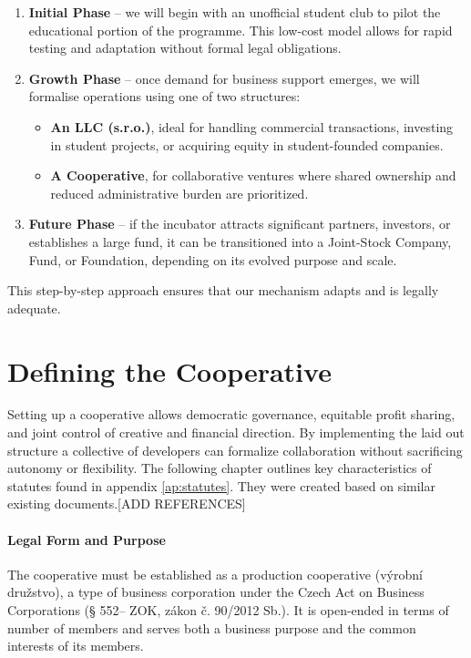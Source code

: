 \begin{enumerate}
    \item \textbf{Initial Phase} – we will begin with an unofficial student club to pilot the educational portion of the programme. This low-cost model allows for rapid testing and adaptation without formal legal obligations.
    \item \textbf{Growth Phase} – once demand for business support emerges, we will formalise operations using one of two structures:
    \begin{itemize}
        \item \textbf{An LLC (s.r.o.)}, ideal for handling commercial transactions, investing in student projects, or acquiring equity in student-founded companies.
        \item \textbf{A Cooperative}, for collaborative ventures where shared ownership and reduced administrative burden are prioritized.
    \end{itemize}
    \item \textbf{Future Phase} – if the incubator attracts significant partners, investors, or establishes a large fund, it can be transitioned into a Joint-Stock Company, Fund, or Foundation, depending on its evolved purpose and scale.
\end{enumerate}

This step-by-step approach ensures that our mechanism adapts and is legally adequate.


\section{Defining the Cooperative}
Setting up a cooperative allows democratic governance, equitable profit sharing, and joint control of creative and financial direction. By implementing the laid out structure a collective of developers can formalize collaboration without sacrificing autonomy or flexibility. The following chapter outlines key characteristics of statutes found in appendix \ref{ap:statutes}. They were created based on similar existing documents.[ADD REFERENCES]
\paragraph{Legal Form and Purpose}
The cooperative must be established as a production cooperative (výrobní družstvo), a type of business corporation under the Czech Act on Business Corporations (§ 552– ZOK, zákon č. 90/2012 Sb.). It is open-ended in terms of number of members and serves both a business purpose and the common interests of its members.

